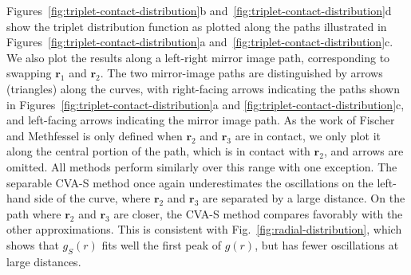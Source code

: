 \documentclass[letterpaper,twocolumn,amsmath,amssymb,pre,aps,10pt]{revtex4-1}
\newcommand{\rr}{\textbf{r}}
\begin{document}
Figures~\ref{fig:triplet-contact-distribution}b
and~\ref{fig:triplet-contact-distribution}d show the triplet
distribution function as plotted along the paths illustrated in
Figures~\ref{fig:triplet-contact-distribution}a
and~\ref{fig:triplet-contact-distribution}c.  We also plot the
results along a left-right mirror image path, corresponding to
swapping $\rr_1$ and $\rr_2$. The two mirror-image paths are
distinguished by arrows (triangles) along the curves, with right-facing arrows
indicating the paths shown in
Figures~\ref{fig:triplet-contact-distribution}a and
\ref{fig:triplet-contact-distribution}c, and left-facing arrows
indicating the mirror image path.  As the work of
Fischer and Methfessel is only defined when $\rr_2$ and $\rr_3$ are in
contact, we only plot it along the
central portion of the path, which is in contact with $\rr_2$, and arrows
are omitted.
%
All methods perform similarly over this range with one exception.  The
separable CVA-S method once again underestimates the oscillations on
the left-hand side of the curve, where $\rr_2$ and $\rr_3$ are
separated by a large distance.  On the path where $\rr_2$ and $\rr_3$
are closer, the CVA-S method compares favorably with the other
approximations.  This is consistent with
Fig.~\ref{fig:radial-distribution}, which shows that $g_S(r)$ fits
well the first peak of $g(r)$, but has fewer oscillations at large
distances.


\end{document}
